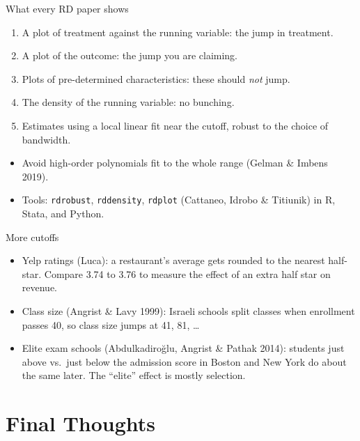 \documentclass[aspectratio=169,11pt]{beamer}
\begin{document}
\begin{frame}{What every RD paper shows}
\begin{enumerate}
	\item A plot of \alert{treatment} against the running variable: the jump in treatment.
	\item A plot of the \alert{outcome}: the jump you are claiming.
	\item Plots of \alert{pre-determined characteristics}: these should \emph{not} jump.
	\item The \alert{density} of the running variable: no bunching.
	\item Estimates using a \alert{local linear} fit near the cutoff, robust to the choice of bandwidth.
\end{enumerate}
\medskip
\begin{itemize}
	\item Avoid high-order polynomials fit to the whole range (Gelman \& Imbens 2019).
	\item Tools: \texttt{rdrobust}, \texttt{rddensity}, \texttt{rdplot} (Cattaneo, Idrobo \& Titiunik) in R, Stata, and Python.
\end{itemize}
\end{frame}


\begin{frame}{More cutoffs}
\begin{itemize}
	\item \alert{Yelp ratings} (Luca): a restaurant's average gets rounded to the nearest half-star. Compare 3.74 to 3.76 to measure the effect of an extra half star on revenue.
	\item \alert{Class size} (Angrist \& Lavy 1999): Israeli schools split classes when enrollment passes 40, so class size jumps at 41, 81, \ldots
	\item \alert{Elite exam schools} (Abdulkadiro\u{g}lu, Angrist \& Pathak 2014): students just above vs.\ just below the admission score in Boston and New York do about the same later. The ``elite'' effect is mostly selection.
\end{itemize}
\end{frame}


\section{Final Thoughts}
\end{document}
